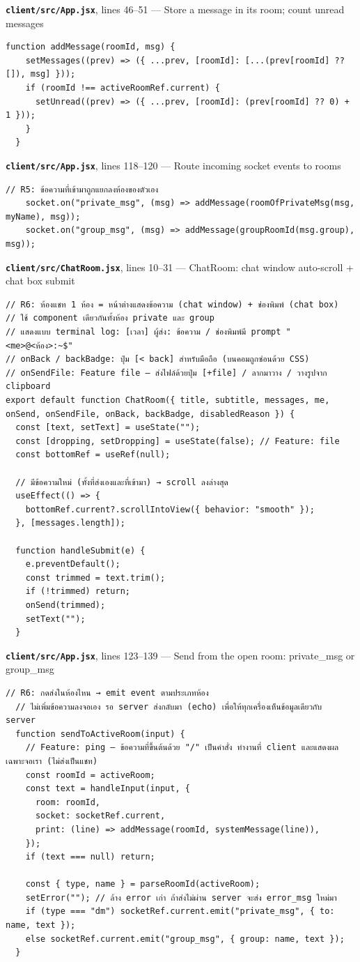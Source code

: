 \documentclass[11pt,a4paper]{article}
\newcommand{\code}[1]{\texttt{#1}}
\newcommand{\snap}[3]{\par\medskip\textbf{\code{#1}}, lines #2 --- #3}
\begin{document}
\snap{client/src/App.jsx}{46--51}{Store a message in its room; count unread messages}
\begin{Verbatim}[firstnumber=46]
  function addMessage(roomId, msg) {
    setMessages((prev) => ({ ...prev, [roomId]: [...(prev[roomId] ?? []), msg] }));
    if (roomId !== activeRoomRef.current) {
      setUnread((prev) => ({ ...prev, [roomId]: (prev[roomId] ?? 0) + 1 }));
    }
  }
\end{Verbatim}

\snap{client/src/App.jsx}{118--120}{Route incoming socket events to rooms}
\begin{Verbatim}[firstnumber=118]
    // R5: ข้อความที่เข้ามาถูกแยกลงห้องของตัวเอง
    socket.on("private_msg", (msg) => addMessage(roomOfPrivateMsg(msg, myName), msg));
    socket.on("group_msg", (msg) => addMessage(groupRoomId(msg.group), msg));
\end{Verbatim}

\snap{client/src/ChatRoom.jsx}{10--31}{ChatRoom: chat window auto-scroll + chat box submit}
\begin{Verbatim}[firstnumber=10]
// R6: ห้องแชท 1 ห้อง = หน้าต่างแสดงข้อความ (chat window) + ช่องพิมพ์ (chat box)
// ใช้ component เดียวกันทั้งห้อง private และ group
// แสดงแบบ terminal log: [เวลา] ผู้ส่ง: ข้อความ / ช่องพิมพ์มี prompt "<me>@<ห้อง>:~$"
// onBack / backBadge: ปุ่ม [< back] สำหรับมือถือ (บนคอมถูกซ่อนด้วย CSS)
// onSendFile: Feature file — ส่งไฟล์ด้วยปุ่ม [+file] / ลากมาวาง / วางรูปจาก clipboard
export default function ChatRoom({ title, subtitle, messages, me, onSend, onSendFile, onBack, backBadge, disabledReason }) {
  const [text, setText] = useState("");
  const [dropping, setDropping] = useState(false); // Feature: file
  const bottomRef = useRef(null);

  // มีข้อความใหม่ (ทั้งที่ส่งเองและที่เข้ามา) → scroll ลงล่างสุด
  useEffect(() => {
    bottomRef.current?.scrollIntoView({ behavior: "smooth" });
  }, [messages.length]);

  function handleSubmit(e) {
    e.preventDefault();
    const trimmed = text.trim();
    if (!trimmed) return;
    onSend(trimmed);
    setText("");
  }
\end{Verbatim}

\snap{client/src/App.jsx}{123--139}{Send from the open room: private\_msg or group\_msg}
\begin{Verbatim}[firstnumber=123]
  // R6: กดส่งในห้องไหน → emit event ตามประเภทห้อง
  // ไม่เพิ่มข้อความลงจอเอง รอ server ส่งกลับมา (echo) เพื่อให้ทุกเครื่องเห็นข้อมูลเดียวกับ server
  function sendToActiveRoom(input) {
    // Feature: ping — ข้อความที่ขึ้นต้นด้วย "/" เป็นคำสั่ง ทำงานที่ client และแสดงผลเฉพาะจอเรา (ไม่ส่งเป็นแชท)
    const roomId = activeRoom;
    const text = handleInput(input, {
      room: roomId,
      socket: socketRef.current,
      print: (line) => addMessage(roomId, systemMessage(line)),
    });
    if (text === null) return;

    const { type, name } = parseRoomId(activeRoom);
    setError(""); // ล้าง error เก่า ถ้าส่งไม่ผ่าน server จะส่ง error_msg ใหม่มา
    if (type === "dm") socketRef.current.emit("private_msg", { to: name, text });
    else socketRef.current.emit("group_msg", { group: name, text });
  }
\end{Verbatim}
\end{document}

